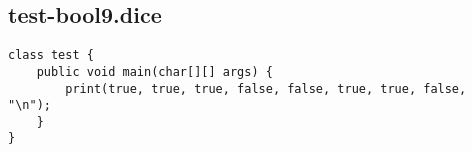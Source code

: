 \subsection{test-bool9.dice}
\begin{verbatim}
class test {
    public void main(char[][] args) {
        print(true, true, true, false, false, true, true, false, "\n");
    }
}
\end{verbatim}
